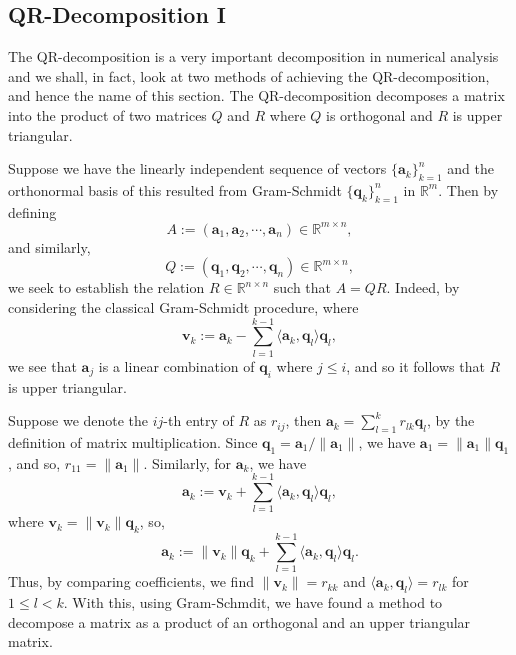 \documentclass[
]{article}
\theoremstyle{definition}
\theoremstyle{definition}
\begin{document}
\hypertarget{qr-decomposition-i}{%
\subsection{QR-Decomposition I}\label{qr-decomposition-i}}

The QR-decomposition is a very important decomposition in numerical
analysis and we shall, in fact, look at two methods of achieving the
QR-decomposition, and hence the name of this section. The
QR-decomposition decomposes a matrix into the product of two matrices
\(Q\) and \(R\) where \(Q\) is orthogonal and \(R\) is upper triangular.

Suppose we have the linearly independent sequence of vectors
\(\{\mathbf{a}_k\}_{k = 1}^n\) and the orthonormal basis of this
resulted from Gram-Schmidt \(\{\mathbf{q}_k\}_{k = 1}^n\) in
\(\mathbb{R}^m\). Then by defining
\[A := (\mathbf{a}_1, \mathbf{a}_2, \cdots, \mathbf{a}_n) \in \mathbb{R}^{m \times n},\]
and similarly,
\[Q := (\mathbf{q}_1, \mathbf{q}_2, \cdots, \mathbf{q}_n) \in \mathbb{R}^{m \times n},\]
we seek to establish the relation \(R \in \mathbb{R}^{n \times n}\) such
that \(A = QR\). Indeed, by considering the classical Gram-Schmidt
procedure, where
\[\mathbf{v}_k := \mathbf{a}_k - \sum_{l = 1}^{k-1} \langle \mathbf{a}_k, 
        \mathbf{q}_l \rangle \mathbf{q}_l,\] we see that
\(\mathbf{a}_j\) is a linear combination of \(\mathbf{q}_i\) where
\(j \le i\), and so it follows that \(R\) is upper triangular.

Suppose we denote the \(ij\)-th entry of \(R\) as \(r_{ij}\), then
\(\mathbf{a}_k = \sum_{l = 1}^k r_{lk}\mathbf{q}_l\), by the definition
of matrix multiplication. Since
\(\mathbf{q}_1 = \mathbf{a}_1 / \|\mathbf{a}_1\|\), we have
\(\mathbf{a}_1 = \|\mathbf{a}_1\| \mathbf{q}_1\), and so,
\(r_{11} = \|\mathbf{a}_1\|\). Similarly, for \(\mathbf{a}_k\), we have
\[\mathbf{a}_k := \mathbf{v}_k + \sum_{l = 1}^{k-1} \langle \mathbf{a}_k, 
        \mathbf{q}_l \rangle \mathbf{q}_l,\] where
\(\mathbf{v}_k = \|\mathbf{v}_k\| \mathbf{q}_k\), so,
\[\mathbf{a}_k := \|\mathbf{v}_k\|\mathbf{q}_k + \sum_{l = 1}^{k-1} \langle \mathbf{a}_k, 
        \mathbf{q}_l \rangle \mathbf{q}_l.\] Thus, by comparing
coefficients, we find \(\|\mathbf{v}_k\| = r_{kk}\) and
\(\langle \mathbf{a}_k, \mathbf{q}_l \rangle = r_{lk}\) for
\(1 \le l < k\). With this, using Gram-Schmdit, we have found a method
to decompose a matrix as a product of an orthogonal and an upper
triangular matrix.
\end{document}
